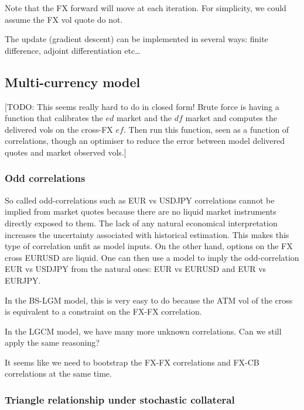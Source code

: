 \documentclass[11pt,english]{amsart}
\theoremstyle{definition}
\begin{document}
Note that the FX forward will move at each iteration. For simplicity, we could assume the FX vol quote do not.

The update (gradient descent) can be implemented in several ways: finite difference, adjoint differentiation etc\ldots




\newpage%
\subsection{Multi-currency model}%


[TODO: This seems really hard to do in closed form! Brute force is having a function that calibrates the $ed$ market and the $df$ market and computes the delivered vols on the cross-FX $ef$. Then run this function, seen as a function of correlations, though an optimiser to reduce the error between model delivered quotes and market observed vols.]

\subsubsection{Odd correlations}


So called odd-correlations such as EUR vs USDJPY correlations cannot be implied from market quotes because there are no liquid market instruments directly exposed to them. The lack of any natural economical interpretation increases the uncertainty associated with historical estimation. This makes this type of correlation unfit as model inputs. On the other hand, options on the FX cross EURUSD are liquid. One can then use a model to imply the odd-correlation EUR vs USDJPY from the natural ones:  EUR vs EURUSD and EUR vs EURJPY.

In the BS-LGM model, this is very easy to do because the ATM vol of the cross is equivalent to a constraint on the FX-FX correlation. 

In the LGCM model, we have many more unknown correlations. Can we still apply the same reasoning?

It seems like we need to bootstrap the FX-FX correlations and FX-CB correlations at the same time. 

\subsubsection{Triangle relationship under stochastic collateral}



\end{document}
